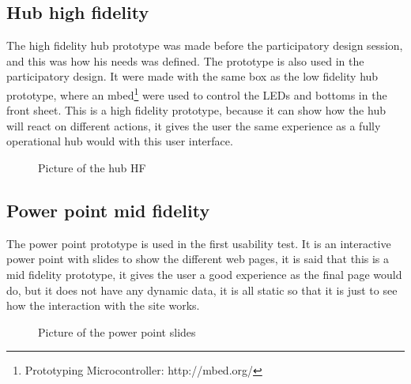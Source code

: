 \subsection{Hub high fidelity}
The high fidelity hub prototype was made before the participatory design session, and this was how his needs was defined. The prototype is also used in the participatory design. It were made with the same box as the low fidelity hub prototype, where an mbed\footnote{Prototyping Microcontroller: http://mbed.org/}  were used to control the LEDs and bottoms in the front sheet. This is a high fidelity prototype, because it can show how the hub will react on different actions, it gives the user the same experience as a fully operational hub would with this user interface.
\begin{figure}[H]
	\center
		\setlength\fboxsep{0pt}
		\setlength\fboxrule{1pt}
   	\caption{Picture of the hub HF}
   	\label{fig:High fidelity hub}
\end{figure}

\subsection{Power point mid fidelity}
The power point prototype is used in the first usability test. It is an interactive power point with slides to show the different web pages, it is said that this is a mid fidelity prototype, it gives the user a good experience as the final page would do, but it does not have any dynamic data, it is all static so that it is just to see how the interaction with the site works.
\begin{figure}[H]
	\center
		\setlength\fboxsep{0pt}
		\setlength\fboxrule{1pt}
   	\caption{Picture of the power point slides}
   	\label{fig:web_interface1}
\end{figure}

